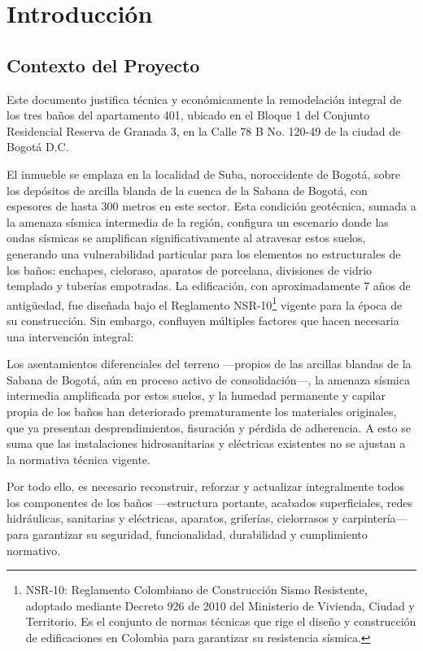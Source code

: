 ﻿\documentclass[12pt]{article}
\begin{document}
\section{Introducción}

\subsection{Contexto del Proyecto}

Este documento justifica técnica y
económicamente la remodelación integral de los tres baños del
apartamento 401, ubicado en el Bloque 1 del Conjunto Residencial Reserva de Granada 3,
en la Calle 78 B No. 120-49 de la ciudad de Bogotá D.C.

El inmueble se emplaza en la localidad de Suba, noroccidente de Bogotá, sobre
los depósitos de arcilla blanda de la cuenca de la Sabana de Bogotá,
con espesores de hasta 300 metros en este sector. Esta condición
geotécnica, sumada a la amenaza sísmica
intermedia de la región, configura un escenario donde las ondas sísmicas
se amplifican significativamente al atravesar estos suelos, generando
una vulnerabilidad particular para los elementos no
estructurales de los baños: enchapes, cieloraso, aparatos de
porcelana, divisiones de vidrio templado y tuberías empotradas. La
edificación, con aproximadamente 7 años de antigüedad, fue diseñada bajo el
Reglamento NSR-10\footnote{NSR-10: Reglamento Colombiano de Construcción Sismo Resistente, adoptado mediante Decreto 926 de 2010 del Ministerio de Vivienda, Ciudad y Territorio. Es el conjunto de normas técnicas que rige el diseño y construcción de edificaciones en Colombia para garantizar su resistencia sísmica.} vigente para la época de su construcción. Sin embargo, confluyen múltiples factores que hacen necesaria una intervención integral:

Los asentamientos diferenciales del terreno —propios de las arcillas blandas de la Sabana de Bogotá, aún en proceso activo de consolidación—, la amenaza sísmica intermedia amplificada por estos suelos, y la humedad permanente y capilar propia de los baños han deteriorado prematuramente los materiales originales, que ya presentan desprendimientos, fisuración y pérdida de adherencia. A esto se suma que las instalaciones hidrosanitarias y eléctricas existentes no se ajustan a la normativa técnica vigente.

Por todo ello, es necesario reconstruir, reforzar y actualizar integralmente todos los componentes de los baños —estructura portante, acabados superficiales, redes hidráulicas, sanitarias y eléctricas, aparatos, griferías, cielorrasos y carpintería— para garantizar su seguridad, funcionalidad, durabilidad y cumplimiento normativo.
\end{document}
